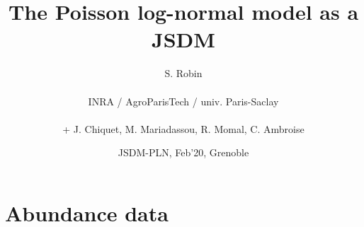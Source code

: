 \documentclass[8pt]{beamer}
\begin{document}

\title{The Poisson log-normal model as a JSDM}

\author[S. Robin]{S. Robin \\ ~\\
  INRA / AgroParisTech / univ. Paris-Saclay \\ ~\\
   + J. Chiquet, M. Mariadassou, R. Momal, C. Ambroise}

\date{JSDM-PLN, Feb'20, Grenoble}

\maketitle


\section{Abundance data}
\end{document}
